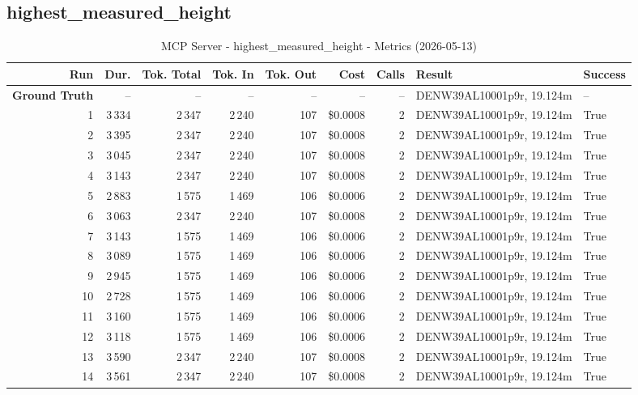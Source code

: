 \documentclass[a4paper,11pt]{article}
\begin{document}
\clearpage
\subsection{highest\_measured\_height}

\begin{table}[ht]
\centering
\scriptsize
\caption{MCP Server - highest\_measured\_height - Metrics (2026-05-13)}
\label{tab:mcp\_highest\_measured\_height\_metrics\_2026-05-13}
\begin{tabular}{r r r r r r r p{3cm} l}
\hline
Run & Dur. & Tok. Total & Tok. In & Tok. Out & Cost & Calls & Result & Success \\
\hline
\textbf{Ground Truth} & -- & -- & -- & -- & -- & -- & DENW39AL10001p9r, 19.124m & -- \\
\hline
1 & 3\,334 & 2\,347 & 2\,240 & 107 & \$0.0008 & 2 & DENW39AL10001p9r, 19.124m & True \\
2 & 3\,395 & 2\,347 & 2\,240 & 107 & \$0.0008 & 2 & DENW39AL10001p9r, 19.124m & True \\
3 & 3\,045 & 2\,347 & 2\,240 & 107 & \$0.0008 & 2 & DENW39AL10001p9r, 19.124m & True \\
4 & 3\,143 & 2\,347 & 2\,240 & 107 & \$0.0008 & 2 & DENW39AL10001p9r, 19.124m & True \\
5 & 2\,883 & 1\,575 & 1\,469 & 106 & \$0.0006 & 2 & DENW39AL10001p9r, 19.124m & True \\
6 & 3\,063 & 2\,347 & 2\,240 & 107 & \$0.0008 & 2 & DENW39AL10001p9r, 19.124m & True \\
7 & 3\,143 & 1\,575 & 1\,469 & 106 & \$0.0006 & 2 & DENW39AL10001p9r, 19.124m & True \\
8 & 3\,089 & 1\,575 & 1\,469 & 106 & \$0.0006 & 2 & DENW39AL10001p9r, 19.124m & True \\
9 & 2\,945 & 1\,575 & 1\,469 & 106 & \$0.0006 & 2 & DENW39AL10001p9r, 19.124m & True \\
10 & 2\,728 & 1\,575 & 1\,469 & 106 & \$0.0006 & 2 & DENW39AL10001p9r, 19.124m & True \\
11 & 3\,160 & 1\,575 & 1\,469 & 106 & \$0.0006 & 2 & DENW39AL10001p9r, 19.124m & True \\
12 & 3\,118 & 1\,575 & 1\,469 & 106 & \$0.0006 & 2 & DENW39AL10001p9r, 19.124m & True \\
13 & 3\,590 & 2\,347 & 2\,240 & 107 & \$0.0008 & 2 & DENW39AL10001p9r, 19.124m & True \\
14 & 3\,561 & 2\,347 & 2\,240 & 107 & \$0.0008 & 2 & DENW39AL10001p9r, 19.124m & True \\

\end{tabular}
\end{table}
\end{document}
